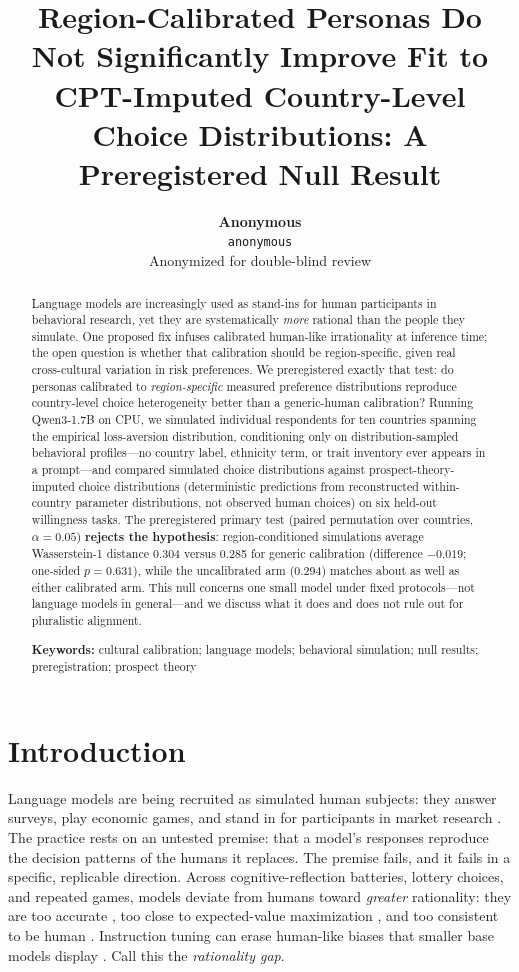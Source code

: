 \documentclass[10pt,letterpaper]{article}
\title{Region-Calibrated Personas Do Not Significantly Improve Fit to
CPT-Imputed Country-Level Choice Distributions:
A Preregistered Null Result}
\author{{\large \bf Anonymous} \\
\texttt{anonymous} \\
\hspace{1cm}Anonymized for double-blind review}
\begin{document}
\maketitle

\begin{abstract}
Language models are increasingly used as stand-ins for human participants
in behavioral research, yet they are systematically \textit{more} rational
than the people they simulate. One proposed fix infuses calibrated
human-like irrationality at inference time; the open question is whether
that calibration should be region-specific, given real cross-cultural
variation in risk preferences. We preregistered exactly that test: do personas
calibrated to \textit{region-specific} measured preference distributions
reproduce country-level choice heterogeneity better than a generic-human
calibration? Running Qwen3-1.7B on CPU, we simulated individual respondents
for ten countries spanning the empirical loss-aversion distribution,
conditioning only on distribution-sampled behavioral profiles---no country
label, ethnicity term, or trait inventory ever appears in a prompt---and
compared simulated choice distributions against prospect-theory-imputed
choice distributions (deterministic predictions from reconstructed
within-country parameter distributions, not observed human choices) on six
held-out willingness tasks. The preregistered primary
test (paired permutation over countries, $\alpha=0.05$) \textbf{rejects the
hypothesis}: region-conditioned simulations average Wasserstein-1 distance
0.304 versus 0.285 for generic calibration (difference $-0.019$; one-sided
$p=0.631$), while the uncalibrated arm (0.294) matches about as well as
either calibrated arm. This null concerns one small
model under fixed protocols---not language models in
general---and we discuss what it does and does not rule out for
pluralistic alignment.

\textbf{Keywords:}
cultural calibration; language models; behavioral simulation; null results;
preregistration; prospect theory
\end{abstract}

\section{Introduction}

Language models are being recruited as simulated human subjects: they answer
surveys, play economic games, and stand in for participants in market
research \citep{argyle2023,aher2023,park2023}. The practice rests on an
untested premise: that a model's responses reproduce the decision patterns
of the humans it replaces. The premise fails, and it fails in a specific,
replicable direction. Across cognitive-reflection batteries, lottery choices, and
repeated games, models deviate from humans toward \textit{greater}
rationality: they are too accurate \citep{aher2023}, too close to
expected-value maximization \citep{liu2025}, and too consistent to be human
\citep{macmillan-scott2024}. Instruction tuning can erase human-like biases
that smaller base models display \citep{hagendorff2023}. Call this the
\textit{rationality gap}.
\end{document}
